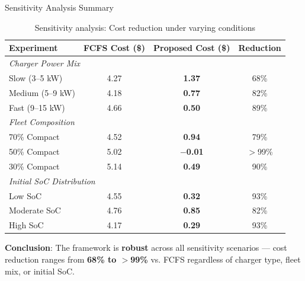 \documentclass{beamer}
\begin{document}
\begin{frame}{Sensitivity Analysis Summary}
  \footnotesize
  \begin{table}[]
  \centering
  \begin{tabular}{|l|c|c|c|}
  \hline
  \textbf{Experiment} & \textbf{FCFS Cost (\$)} & \textbf{Proposed Cost (\$)} & \textbf{Reduction} \\
  \hline
  \multicolumn{4}{|l|}{\textit{Charger Power Mix}} \\
  \hline
  Slow (3--5 kW)    & 4.27 & \textbf{1.37} & 68\% \\
  Medium (5--9 kW)   & 4.18 & \textbf{0.77} & 82\% \\
  Fast (9--15 kW)    & 4.66 & \textbf{0.50} & 89\% \\
  \hline
  \multicolumn{4}{|l|}{\textit{Fleet Composition}} \\
  \hline
  70\% Compact       & 4.52 & \textbf{0.94} & 79\% \\
  50\% Compact       & 5.02 & \textbf{$-$0.01} & $>$99\% \\
  30\% Compact       & 5.14 & \textbf{0.49} & 90\% \\
  \hline
  \multicolumn{4}{|l|}{\textit{Initial SoC Distribution}} \\
  \hline
  Low SoC            & 4.55 & \textbf{0.32} & 93\% \\
  Moderate SoC       & 4.76 & \textbf{0.85} & 82\% \\
  High SoC           & 4.17 & \textbf{0.29} & 93\% \\
  \hline
  \end{tabular}
  \caption{Sensitivity analysis: Cost reduction under varying conditions}
  \end{table}
  \normalsize
  \textbf{Conclusion}: The framework is \textbf{robust} across all sensitivity scenarios --- cost reduction ranges from \textbf{68\% to $>$99\%} vs. FCFS regardless of charger type, fleet mix, or initial SoC.
\end{frame}

\end{document}
